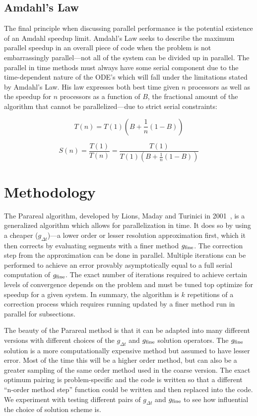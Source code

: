 \documentclass[letterpaper,12pt]{article}
\begin{document}
\subsection{Amdahl's Law}

The final principle when discussing parallel performance is the potential existence of an Amdahl speedup limit. Amdahl's Law seeks to describe the maximum parallel speedup in an overall piece of code when the problem is not embarrassingly parallel---not all of the system can be divided up in parallel. The parallel in time methods must always have some serial component due to the time-dependent nature of the ODE's which will fall under the limitations stated by Amdahl's Law. His law expresses both best time given $n$ processors as well as the speedup for $n$ processors as a function of $B$, the fractional amount of the algorithm that cannot be parallelized---due to strict serial constraints:

\begin{equation}
T(n) = T(1) \left( B + \frac{1}{n} (1-B) \right)
\end{equation}

\begin{equation}
S(n) = \frac{T(1)}{T(n)} = \frac{T(1)}{ T(1) \left( B + \frac{1}{n} (1-B) \right)}
\end{equation}

\section{Methodology}

The Parareal algorithm, developed by Lions, Maday and Turinici in
2001~\cite{lions2001parareal}, is a generalized algorithm which allows for
parallelization in time. It does so by using a cheaper ($g_{\Delta t}$)---a
lower order or lesser resolution approximation first, which it then corrects by
evaluating segments with a finer method $g_{\textnormal{fine}}$. The correction
step from the approximation can be done in parallel. Multiple iterations can be
performed to achieve an error provably asymptotically equal to a full serial
computation of $g_{\textnormal{fine}}$. The exact number of iterations required
to achieve certain levels of convergence depends on the problem and must be
tuned top optimize for speedup for a given system. In summary, the algorithm is
$k$ repetitions of a correction process which requires running updated by a
finer method run in parallel for subsections.

The beauty of the Parareal method is that it can be adapted into many different versions with different choices of the $g_{\Delta t}$ and $g_{\textnormal{fine}}$ solution operators. The $g_{\textnormal{fine}}$ solution is a more computationally expensive method but assumed to have lesser error. Most of the time this will be a higher order method, but can also be a greater sampling of the same order method used in the coarse version. The exact optimum pairing is problem-specific and the code is written so that a different ``n-order method step'' function could be written and then replaced into the code. We experiment with testing different pairs of $g_{\Delta t}$ and $g_{\textnormal{fine}}$ to see how influential the choice of solution scheme is.
\end{document}
